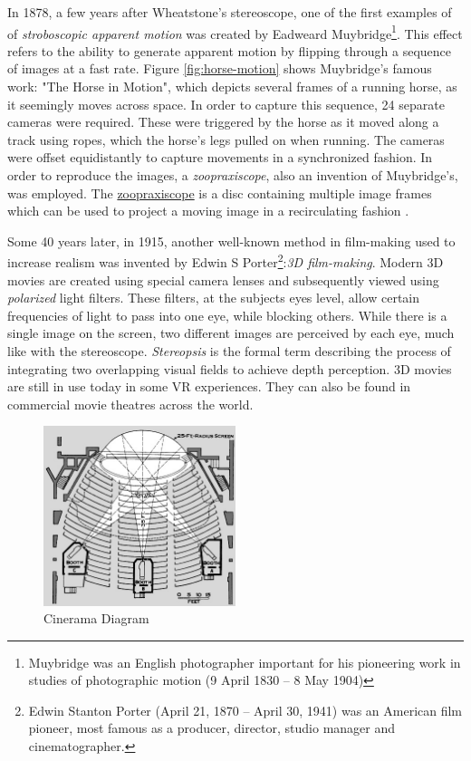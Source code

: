 In 1878, a few years after Wheatstone's stereoscope, one of the first examples of of \textit{stroboscopic apparent motion} was created by Eadweard Muybridge\footnote{Muybridge was an English photographer important for his pioneering work in studies of photographic motion (9 April 1830 – 8 May 1904)}. This effect refers to the ability to generate apparent motion by flipping through a sequence of images at a fast rate. Figure \ref{fig:horse-motion} shows Muybridge's famous work: "The Horse in Motion", which depicts several frames of a running horse, as it seemingly moves across space. In order to capture this sequence, 24 separate cameras were required. These were triggered by the horse as it moved along a track using ropes, which the horse's legs pulled on when running. The cameras were offset equidistantly to capture movements in a synchronized fashion. In order to reproduce the images, a \textit{zoopraxiscope}, also an invention of Muybridge's, was employed. The \href{https://upload.wikimedia.org/wikipedia/commons/0/06/The_zoopraxiscope-Horse_galloping-Animated.gif}{zoopraxiscope} is a disc containing multiple image frames which can be used to project a moving image in a recirculating fashion \cite{lavalle2016virtual}. 

Some 40 years later, in 1915, another well-known method in film-making used to increase realism was invented by Edwin S Porter\footnote{Edwin Stanton Porter (April 21, 1870 – April 30, 1941) was an American film pioneer, most famous as a producer, director, studio manager and cinematographer.}:\textit{3D film-making}. Modern 3D movies are created using special camera lenses and subsequently viewed using \textit{polarized} light filters. These filters, at the subjects eyes level, allow certain frequencies of light to pass into one eye, while blocking others. While there is a single image on the screen, two different images are perceived by each eye, much like with the stereoscope. \textit{Stereopsis} is the formal term describing the process of integrating two overlapping visual fields to achieve depth perception. 3D movies are still in use today in some VR experiences. They can also be found in commercial movie theatres across the world. 

\begin{figure}[ht!]%
\centering
\includegraphics[width=0.5\textwidth]{img/cinerama.jpg} 
\caption{Cinerama Diagram \cite{FileHowC90online}}
\label{img:cinerama}
\end{figure}

